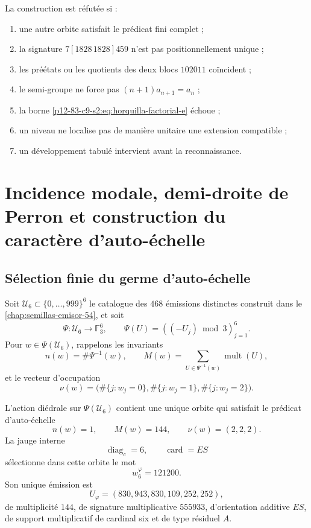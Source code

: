 \begin{criterion}
La construction est réfutée si :
\begin{enumerate}
 \item une autre orbite satisfait le prédicat fini complet ;
 \item la signature \(7[1828\,1828]459\) n’est pas positionnellement unique ;
 \item les préétats ou les quotients des deux blocs \(102011\) coïncident ;
 \item le semi-groupe ne force pas \((n+1)a_{n+1}=a_n\) ;
 \item la borne \eqref{p12-83-c9-s2:eq:horquilla-factorial-e} échoue ;
 \item un niveau ne localise pas de manière unitaire une extension compatible ;
 \item un développement tabulé intervient avant la reconnaissance.
\end{enumerate}
\end{criterion}



\section{Incidence modale, demi-droite de Perron et construction du caractère d'auto-échelle}
\label{p12-83-c9-s3:chap:biografia-completa-phi}

\subsection{Sélection finie du germe d’auto-échelle}

Soit \(\mathcal U_6\subset\{0,\ldots,999\}^6\) le catalogue des
\(468\) émissions distinctes construit dans le
\cref{chap:semillas-emisor-54}, et soit
\[
 \Psi:\mathcal U_6\longrightarrow\mathbb F_3^6,
 \qquad
 \Psi(U)=((-U_j)\bmod3)_{j=1}^{6}.
\]
Pour \(w\in\Psi(\mathcal U_6)\), rappelons les invariants
\[
 n(w)=\#\Psi^{-1}(w),
 \qquad
 M(w)=\sum_{U\in\Psi^{-1}(w)}\operatorname{mult}(U),
\]
et le vecteur d’occupation
\[
 \nu(w)=
 \bigl(\#\{j:w_j=0\},\#\{j:w_j=1\},\#\{j:w_j=2\}\bigr).
\]

\begin{theorem}
\label{p12-83-c9-s3:thm:seleccion-orbital-phi}
L’action diédrale sur \(\Psi(\mathcal U_6)\) contient une unique orbite
qui satisfait le prédicat d’auto-échelle
\[
 n(w)=1,
 \qquad
 M(w)=144,
 \qquad
 \nu(w)=(2,2,2).
\]
La jauge interne
\[
 \operatorname{diag}_c=6,
 \qquad
 \operatorname{card}=ES
\]
sélectionne dans cette orbite le mot
\[
 \boxed{w_6^{\varphi}=121200.}
\]
Son unique émission est
\[
 \boxed{U_{\varphi}=(830,943,830,109,252,252),}
\]
de multiplicité \(144\), de signature multiplicative \(555933\), d’orientation
additive \(ES\), de support multiplicatif de cardinal six et de type résiduel
\(A\).
\end{theorem}

